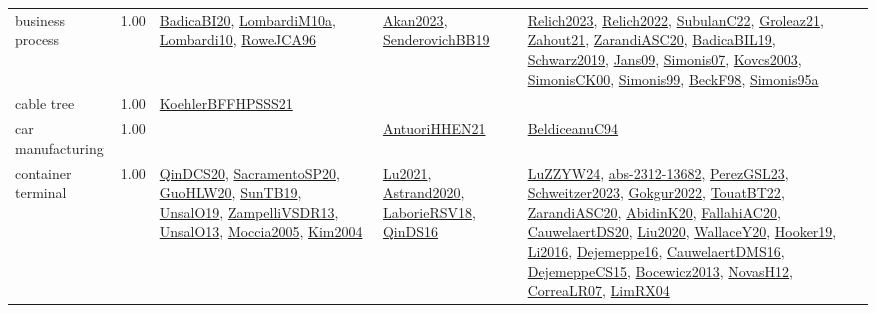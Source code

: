 {\begin{longtable}{p{3cm}r>{\raggedright\arraybackslash}p{6cm}>{\raggedright\arraybackslash}p{6cm}>{\raggedright\arraybackslash}p{8cm}}
\index{business process}\index{ApplicationAreas!business process}business process &  1.00 & \hyperref[detail:BadicaBI20]{BadicaBI20}, \hyperref[detail:LombardiM10a]{LombardiM10a}, \hyperref[detail:Lombardi10]{Lombardi10}, \hyperref[detail:RoweJCA96]{RoweJCA96} & \hyperref[detail:Akan2023]{Akan2023}, \hyperref[detail:SenderovichBB19]{SenderovichBB19} & \hyperref[detail:Relich2023]{Relich2023}, \hyperref[detail:Relich2022]{Relich2022}, \hyperref[detail:SubulanC22]{SubulanC22}, \hyperref[detail:Groleaz21]{Groleaz21}, \hyperref[detail:Zahout21]{Zahout21}, \hyperref[detail:ZarandiASC20]{ZarandiASC20}, \hyperref[detail:BadicaBIL19]{BadicaBIL19}, \hyperref[detail:Schwarz2019]{Schwarz2019}, \hyperref[detail:Jans09]{Jans09}, \hyperref[detail:Simonis07]{Simonis07}, \hyperref[detail:Kovcs2003]{Kovcs2003}, \hyperref[detail:SimonisCK00]{SimonisCK00}, \hyperref[detail:Simonis99]{Simonis99}, \hyperref[detail:BeckF98]{BeckF98}, \hyperref[detail:Simonis95a]{Simonis95a}\\
\index{cable tree}\index{ApplicationAreas!cable tree}cable tree &  1.00 & \hyperref[detail:KoehlerBFFHPSSS21]{KoehlerBFFHPSSS21} &  & \\
\index{car manufacturing}\index{ApplicationAreas!car manufacturing}car manufacturing &  1.00 &  & \hyperref[detail:AntuoriHHEN21]{AntuoriHHEN21} & \hyperref[detail:BeldiceanuC94]{BeldiceanuC94}\\
\index{container terminal}\index{ApplicationAreas!container terminal}container terminal &  1.00 & \hyperref[detail:QinDCS20]{QinDCS20}, \hyperref[detail:SacramentoSP20]{SacramentoSP20}, \hyperref[detail:GuoHLW20]{GuoHLW20}, \hyperref[detail:SunTB19]{SunTB19}, \hyperref[detail:UnsalO19]{UnsalO19}, \hyperref[detail:ZampelliVSDR13]{ZampelliVSDR13}, \hyperref[detail:UnsalO13]{UnsalO13}, \hyperref[detail:Moccia2005]{Moccia2005}, \hyperref[detail:Kim2004]{Kim2004} & \hyperref[detail:Lu2021]{Lu2021}, \hyperref[detail:Astrand2020]{Astrand2020}, \hyperref[detail:LaborieRSV18]{LaborieRSV18}, \hyperref[detail:QinDS16]{QinDS16} & \hyperref[detail:LuZZYW24]{LuZZYW24}, \hyperref[detail:abs-2312-13682]{abs-2312-13682}, \hyperref[detail:PerezGSL23]{PerezGSL23}, \hyperref[detail:Schweitzer2023]{Schweitzer2023}, \hyperref[detail:Gokgur2022]{Gokgur2022}, \hyperref[detail:TouatBT22]{TouatBT22}, \hyperref[detail:ZarandiASC20]{ZarandiASC20}, \hyperref[detail:AbidinK20]{AbidinK20}, \hyperref[detail:FallahiAC20]{FallahiAC20}, \hyperref[detail:CauwelaertDS20]{CauwelaertDS20}, \hyperref[detail:Liu2020]{Liu2020}, \hyperref[detail:WallaceY20]{WallaceY20}, \hyperref[detail:Hooker19]{Hooker19}, \hyperref[detail:Li2016]{Li2016}, \hyperref[detail:Dejemeppe16]{Dejemeppe16}, \hyperref[detail:CauwelaertDMS16]{CauwelaertDMS16}, \hyperref[detail:DejemeppeCS15]{DejemeppeCS15}, \hyperref[detail:Bocewicz2013]{Bocewicz2013}, \hyperref[detail:NovasH12]{NovasH12}, \hyperref[detail:CorreaLR07]{CorreaLR07}, \hyperref[detail:LimRX04]{LimRX04}\\

\end{longtable}}
